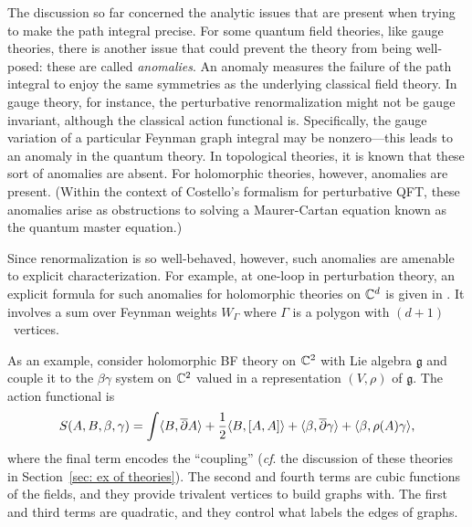 \documentclass[11pt]{amsart}
\def\lie#1{\ensuremath{\mathfrak{#1}}}
\begin{document}
The discussion so far concerned the analytic issues that are present when trying to make the path integral precise.
For some quantum field theories, like gauge theories, there is another issue that could prevent the theory from being well-posed:
these are called {\em anomalies}.
An anomaly measures the failure of the path integral to enjoy the same symmetries as the underlying classical field theory.
In gauge theory, for instance, the perturbative renormalization might not be gauge invariant, although the classical action functional is.
Specifically, the gauge variation of a particular Feynman graph integral may be nonzero---this leads to an anomaly in the quantum theory.
In topological theories, it is known that these sort of anomalies are absent.
For holomorphic theories, however, anomalies are present.
(Within the context of Costello's formalism for perturbative QFT,
these anomalies arise as obstructions to solving a Maurer-Cartan equation known as the quantum master equation.)

Since renormalization is so well-behaved, however, such anomalies are amenable to explicit characterization.
For example, at one-loop in perturbation theory, an explicit formula for such anomalies for holomorphic theories on ${\mathbb{C}}^d$ is given in \cite{Wrenorm}.
It involves a sum over Feynman weights $W_\Gamma$ where $\Gamma$ is a polygon with $(d+1)$~vertices.

As an example, consider holomorphic BF theory on ${\mathbb{C}}^2$ with Lie algebra $\lie{g}$
and couple it to the $\beta\gamma$ system on ${\mathbb{C}}^2$ valued in a representation $(V, \rho)$ of $\lie{g}$.
The action functional is
\[
S(A,B, \beta, \gamma) = \int \langle B, {\overline{\partial}} A\rangle + \frac{1}{2} \langle B, [A,A]\rangle + \langle \beta, {\overline{\partial}} \gamma\rangle + \langle \beta, \rho(A)\gamma\rangle,
\]
where the final term encodes the ``coupling'' ({\it cf}. the discussion of these theories in Section~\ref{sec: ex of theories}).
The second and fourth terms are cubic functions of the fields,
and they provide trivalent vertices to build graphs with.
The first and third terms are quadratic, and they control what labels the edges of graphs.
\end{document}
